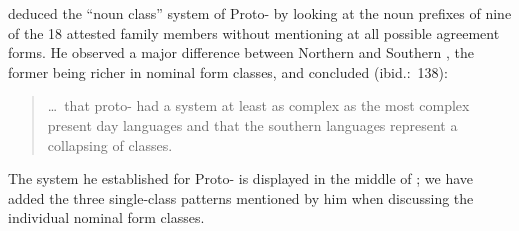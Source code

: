 \documentclass[output=collectionpaper]{langsci/langscibook}
\begin{document}
\citet{Snider1988} deduced the ``noun class'' system of Proto- by looking at the noun prefixes of nine of the 18 attested family members without mentioning at all possible agreement forms. He observed a major difference between Northern and Southern , the former being richer in nominal form classes, and concluded (ibid.:~138):

\begin{quote}
\ldots\ that proto- had a system at least as complex as the most complex present day  languages and that the southern  languages represent a collapsing of classes.
\end{quote}

The system he established for Proto- is displayed in the middle of ; we have added the three single-class patterns mentioned by him when discussing the individual nominal form classes.
\end{document}
